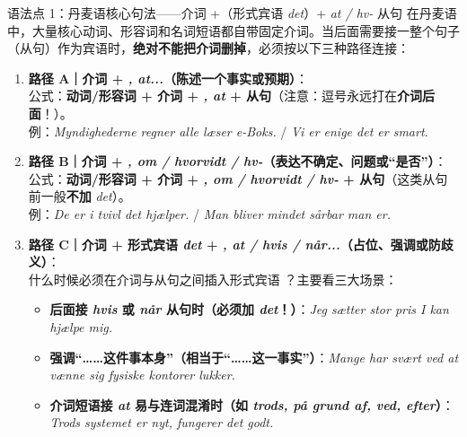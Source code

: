 \begin{grammatikbox}{语法点 1：丹麦语核心句法——介词 +（形式宾语 \textit{det}）+ \textit{at / hv-} 从句}
在丹麦语中，大量核心动词、形容词和名词短语都自带固定介词。当后面需要接一整个句子（从句）作为宾语时，\textbf{绝对不能把介词删掉}，必须按以下三种路径连接：
\begin{enumerate}
  \item \textbf{路径 A｜介词 + \textit{, at...}（陈述一个事实或预期）}：\\
    公式：\textbf{动词/形容词 + 介词 + \textit{, at} + 从句}（注意：逗号永远打在\textbf{介词后面}！）。\\
    例：\textit{Myndighederne regner  alle læser e-Boks.} / \textit{Vi er enige  det er smart.}
  \item \textbf{路径 B｜介词 + \textit{, om / hvorvidt / hv-}（表达不确定、问题或“是否”）}：\\
    公式：\textbf{动词/形容词 + 介词 + \textit{, om / hvorvidt / hv-} + 从句}（这类从句前一般\textbf{不加} \textit{det}）。\\
    例：\textit{De er i tvivl  det hjælper.} / \textit{Man bliver mindet  sårbar man er.}
  \item \textbf{路径 C｜介词 + 形式宾语 \textit{det} + \textit{, at / hvis / når...}（占位、强调或防歧义）}：\\
    什么时候必须在介词与从句之间插入形式宾语 ？主要看三大场景：
    \begin{itemize}
      \item {} \textbf{后面接 \textit{hvis} 或 \textit{når} 从句时（必须加 \textit{det}！）}：\textit{Jeg sætter stor pris  I kan hjælpe mig.}
      \item {} \textbf{强调“……这件事本身”（相当于“……这一事实”）}：\textit{Mange har svært ved at vænne sig  fysiske kontorer lukker.}
      \item {} \textbf{介词短语接 \textit{at} 易与连词混淆时（如 \textit{trods, på grund af, ved, efter}）}：\textit{Trods  systemet er nyt, fungerer det godt.}
    \end{itemize}
\end{enumerate}
\end{grammatikbox}

